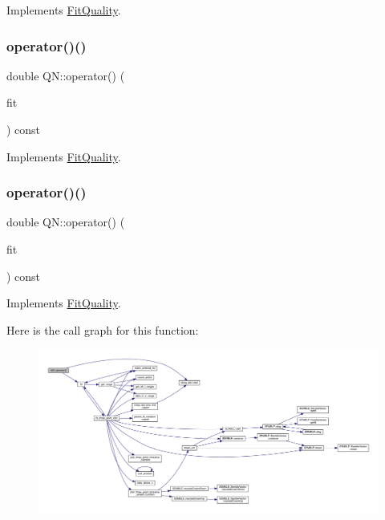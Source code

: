 Implements \mbox{\hyperlink{classFitQuality_a3423e236f25d68cf822094b363a74780}{Fit\+Quality}}.

\mbox{\label{classQN_a3328fcfb7a093b9e843cd0da56bf09f3}} 
\subsubsection{\texorpdfstring{operator()()}{operator()()}\hspace{0.1cm}{\footnotesize\ttfamily [1/2]}}
{\footnotesize\ttfamily double Q\+N\+::operator() (\begin{DoxyParamCaption}\item[{const \mbox{\hyperlink{classAvgFit}{Avg\+Fit}} \&}]{fit }\end{DoxyParamCaption}) const\hspace{0.3cm}{\ttfamily [virtual]}}



Implements \mbox{\hyperlink{classFitQuality_a49a49e1206709d71c3ead41e981bb848}{Fit\+Quality}}.

\mbox{\label{classQN_a3328fcfb7a093b9e843cd0da56bf09f3}} 
\subsubsection{\texorpdfstring{operator()()}{operator()()}\hspace{0.1cm}{\footnotesize\ttfamily [2/2]}}
{\footnotesize\ttfamily double Q\+N\+::operator() (\begin{DoxyParamCaption}\item[{const \mbox{\hyperlink{classAvgFit}{Avg\+Fit}} \&}]{fit }\end{DoxyParamCaption}) const\hspace{0.3cm}{\ttfamily [virtual]}}



Implements \mbox{\hyperlink{classFitQuality_a49a49e1206709d71c3ead41e981bb848}{Fit\+Quality}}.

Here is the call graph for this function\+:
\nopagebreak
\begin{figure}[H]
\begin{center}
\leavevmode
\includegraphics[width=350pt]{d3/db7/classQN_a3328fcfb7a093b9e843cd0da56bf09f3_cgraph}
\end{center}
\end{figure}


